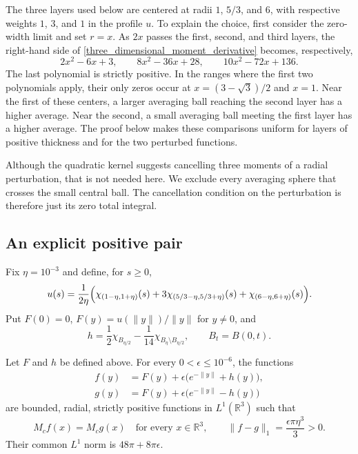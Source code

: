 \documentclass[12pt]{amsart}
\numberwithin{equation}{section}
\begin{document}
The three layers used below are centered at radii $1$, $5/3$, and $6$,
with respective weights $1$, $3$, and $1$ in the profile $u$.
To explain the choice, first consider the zero-width limit and set
$r=x$. As $2x$ passes the first, second, and third layers, the
right-hand side of \eqref{three_dimensional_moment_derivative}
becomes, respectively,
\[
2x^2-6x+3,\qquad
8x^2-36x+28,\qquad
10x^2-72x+136.
\]
The last polynomial is strictly positive. In the ranges where the
first two polynomials apply, their only zeros occur at
$x=(3-\sqrt3)/2$ and $x=1$. Near the first of these centers, a larger
averaging ball reaching the second layer has a higher average. Near
the second, a small averaging ball meeting the first layer has a
higher average. The proof below makes these comparisons uniform for
layers of positive thickness and for the two perturbed functions.

Although the quadratic kernel suggests cancelling three moments of
a radial perturbation, that is not needed here. We exclude every
averaging sphere that crosses the small central ball. The cancellation
condition on the perturbation is therefore just its zero total integral.

\subsection{An explicit positive pair}

Fix $\eta=10^{-3}$ and define, for $s\geq0$,
\begin{equation}
\label{three_dimensional_profile}
u(s)=\frac{1}{2\eta}\Bigl(
 \chi_{(1-\eta,1+\eta)}(s)
 +3\chi_{(5/3-\eta,5/3+\eta)}(s)
 +\chi_{(6-\eta,6+\eta)}(s)\Bigr).
\end{equation}
Put $F(0)=0$, $F(y)=u(\|y\|)/\|y\|$ for $y\ne0$, and
\begin{equation}
\label{three_dimensional_perturbation}
h=\frac12\chi_{B_{\eta/2}}
          -\frac1{14}\chi_{B_\eta\setminus B_{\eta/2}},
\qquad B_t=B(0,t).
\end{equation}
\begin{samepage}
\begin{theorem}
\label{three_dimensional_theorem}
Let $F$ and $h$ be defined above. For every $0<\epsilon\leq10^{-6}$,
the functions
\begin{equation}
\label{three_dimensional_pair}
\begin{aligned}
f(y)&=F(y)+\epsilon\bigl(e^{-\|y\|}+h(y)\bigr),\\
g(y)&=F(y)+\epsilon\bigl(e^{-\|y\|}-h(y)\bigr)
\end{aligned}
\end{equation}
are bounded, radial, strictly positive functions in $L^1(\mathbb{R}^3)$
such that
\begin{equation}
\label{three_dimensional_conclusion}
M_cf(x)=M_cg(x)\quad\text{for every }x\in\mathbb{R}^3,
\qquad \|f-g\|_1=\frac{\epsilon\pi\eta^3}{3}>0.
\end{equation}
Their common $L^1$ norm is $48\pi+8\pi\epsilon$.
\end{theorem}
\end{samepage}
\end{document}
